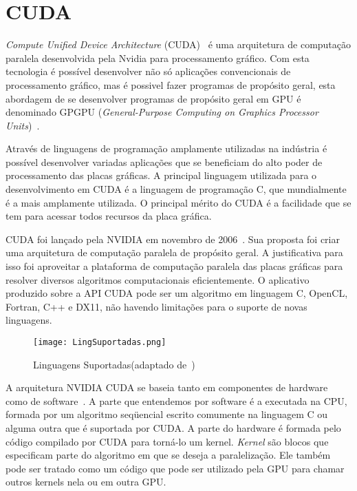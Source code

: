\section{CUDA}\label{intro:contexto}

\textit{Compute Unified Device Architecture} (CUDA)~\citep{cuda} é uma arquitetura de computação paralela desenvolvida pela Nvidia para processamento gráfico.
Com esta tecnologia é possível desenvolver não só aplicações convencionais de processamento gráfico, mas é possivel fazer programas de propósito geral, esta abordagem de se desenvolver programas de propósito geral em GPU é denominado GPGPU (\textit{General-Purpose Computing on Graphics Processor Units})~\citep{GPGPU}.

Através de linguagens de programação amplamente utilizadas na indústria é possível desenvolver variadas aplicações que se beneficiam do alto poder de processamento das placas gráficas. A principal linguagem utilizada para o desenvolvimento em CUDA é a linguagem de
programação C, que mundialmente é a mais amplamente utilizada. O principal mérito do CUDA é a facilidade que se tem para acessar todos recursos da placa gráfica.

CUDA foi lançado pela NVIDIA em novembro de 2006~\citep{cuda}. Sua proposta foi criar uma arquitetura de computação paralela de propósito geral. A justificativa para isso foi aproveitar a plataforma de computação paralela das placas gráficas para resolver diversos algoritmos
computacionais eficientemente. O aplicativo produzido sobre a API CUDA pode ser um algoritmo em linguagem C, OpenCL, Fortran, C++ e DX11, não havendo limitações para o suporte de novas linguagens. 

\begin{figure}[htb]
	\begin{center}
	\centering
			\texttt{[image: LingSuportadas.png]}
	\label{fig: lingSuportadas}
	\caption{Linguagens Suportadas(adaptado de~\citep{cuda})}
	\end{center}
\end{figure}

A arquitetura NVIDIA CUDA se baseia tanto em componentes de hardware como de software~\citep{cuda}. A parte que entendemos por software é a executada na CPU, formada por um algoritmo seqüencial escrito comumente na linguagem C ou alguma outra que é suportada por CUDA. A parte do hardware é formada pelo código compilado por CUDA para torná-lo um kernel. \textit{Kernel} são blocos que especificam parte do algoritmo em que se deseja a
paralelização. Ele também pode ser tratado como um código que pode ser utilizado pela GPU para chamar outros kernels nela ou em outra GPU.

